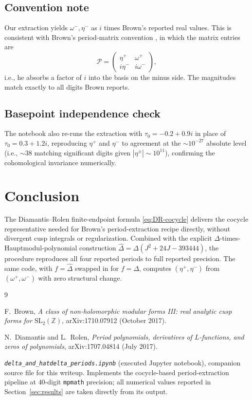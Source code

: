 \documentclass[11pt,letterpaper]{article}
\newcommand{\ZZ}{\mathbb{Z}}
\newcommand{\Dhat}{\widehat{\Delta}}
\begin{document}
\subsection*{Convention note}
Our extraction yields $\omega^-, \eta^-$ as $i$ times Brown's reported real values. This is consistent with Brown's period-matrix convention \cite[eq.\ (2.13)]{Brown2017}, in which the matrix entries are
\[
  \mathcal{P} = \begin{pmatrix} \eta^+ & \omega^+ \\ i\eta^- & i\omega^- \end{pmatrix},
\]
i.e., he absorbs a factor of $i$ into the basis on the minus side. The magnitudes match exactly to all digits Brown reports.

\subsection*{Basepoint independence check}
The notebook also re-runs the extraction with $\tau_0 = -0.2 + 0.9 i$ in place of $\tau_0 = 0.3 + 1.2 i$, reproducing $\eta^+$ and $\eta^-$ to agreement at the $\sim 10^{-27}$ absolute level (i.e., $\sim 38$ matching significant digits given $|\eta^\pm| \sim 10^{11}$), confirming the cohomological invariance numerically.

\section{Conclusion}

The Diamantis--Rolen finite-endpoint formula \eqref{eq:DR-cocycle} delivers the cocycle representative needed for Brown's period-extraction recipe directly, without divergent cusp integrals or regularization. Combined with the explicit $\Delta$-times-Hauptmodul-polynomial construction $\Dhat = \Delta(J^2 + 24 J - 393444)$, the procedure reproduces all four reported periods to full reported precision. The same code, with $f = \Dhat$ swapped in for $f = \Delta$, computes $(\eta^+, \eta^-)$ from $(\omega^+, \omega^-)$ with zero structural change.

\begin{thebibliography}{9}

F.\ Brown,
\emph{A class of non-holomorphic modular forms III: real analytic cusp forms for $\mathrm{SL}_2(\ZZ)$},
arXiv:1710.07912 (October 2017).

N.\ Diamantis and L.\ Rolen,
\emph{Period polynomials, derivatives of $L$-functions, and zeros of polynomials},
arXiv:1707.04814 (July 2017).

\emph{\texttt{delta\_and\_hatdelta\_periods.ipynb}} (executed Jupyter notebook),
companion source file for this writeup. Implements the cocycle-based period-extraction pipeline at $40$-digit \texttt{mpmath} precision; all numerical values reported in Section~\ref{sec:results} are taken directly from its output.

\end{thebibliography}
\end{document}
